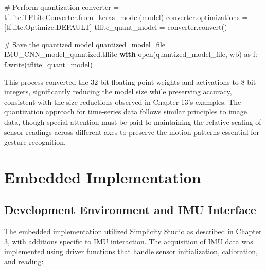 \documentclass[
  9pt,
  letterpaper,
  abstract,
  titlepage]{scrbook}
\newenvironment{Shaded}{\begin{snugshade}}{\end{snugshade}}
\newcommand{\BuiltInTok}[1]{\textcolor[rgb]{0.00,0.23,0.31}{#1}}
\newcommand{\CommentTok}[1]{\textcolor[rgb]{0.37,0.37,0.37}{#1}}
\newcommand{\ControlFlowTok}[1]{\textcolor[rgb]{0.00,0.23,0.31}{\textbf{#1}}}
\newcommand{\ImportTok}[1]{\textcolor[rgb]{0.00,0.46,0.62}{#1}}
\newcommand{\NormalTok}[1]{\textcolor[rgb]{0.00,0.23,0.31}{#1}}
\newcommand{\OperatorTok}[1]{\textcolor[rgb]{0.37,0.37,0.37}{#1}}
\newcommand{\StringTok}[1]{\textcolor[rgb]{0.13,0.47,0.30}{#1}}
\begin{document}
\begin{Shaded}
\begin{Highlighting}[]
\CommentTok{\# Perform quantization}
\NormalTok{converter }\OperatorTok{=}\NormalTok{ tf.lite.TFLiteConverter.from\_keras\_model(model)}
\NormalTok{converter.optimizations }\OperatorTok{=}\NormalTok{ [tf.lite.Optimize.DEFAULT]}
\NormalTok{tflite\_quant\_model }\OperatorTok{=}\NormalTok{ converter.convert()}

\CommentTok{\# Save the quantized model}
\NormalTok{quantized\_model\_file }\OperatorTok{=} \StringTok{\textquotesingle{}IMU\_CNN\_model\_quantized.tflite\textquotesingle{}}
\ControlFlowTok{with} \BuiltInTok{open}\NormalTok{(quantized\_model\_file, }\StringTok{\textquotesingle{}wb\textquotesingle{}}\NormalTok{) }\ImportTok{as}\NormalTok{ f:}
\NormalTok{    f.write(tflite\_quant\_model)}
\end{Highlighting}
\end{Shaded}

This process converted the 32-bit floating-point weights and activations
to 8-bit integers, significantly reducing the model size while
preserving accuracy, consistent with the size reductions observed in
Chapter 13's examples. The quantization approach for time-series data
follows similar principles to image data, though special attention must
be paid to maintaining the relative scaling of sensor readings across
different axes to preserve the motion patterns essential for gesture
recognition.

\section{Embedded Implementation}\label{embedded-implementation-1}

\subsection{Development Environment and IMU
Interface}\label{development-environment-and-imu-interface}

The embedded implementation utilized Simplicity Studio as described in
Chapter 3, with additions specific to IMU interaction. The acquisition
of IMU data was implemented using driver functions that handle sensor
initialization, calibration, and reading:
\end{document}
